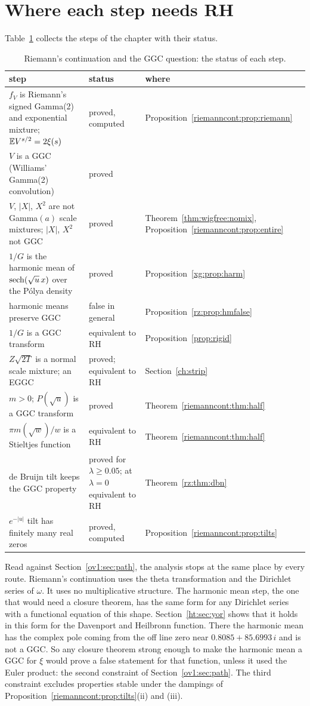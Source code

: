 \section{Where each step needs RH}\label{riemanncont:sec:path}

Table~\ref{riemanncont:tab:steps} collects the steps of the chapter with their status.

\begin{table}[htbp]
\centering\small
\begin{tabular}{p{}p{}p{}}
\toprule
step & status & where\\
\midrule
$f_V$ is Riemann's signed Gamma(2) and exponential mixture; $\mathbb{E} V^{s/2}=2\xi(s)$ & \raggedright proved, computed & Proposition~\ref{riemanncont:prop:riemann}\tabularnewline
$V$ is a GGC (Williams' Gamma(2) convolution) & proved & \cite{Williams90,BPY01}\tabularnewline
$V$, $|X|$, $X^2$ are not Gamma$(a)$ scale mixtures; $|X|$, $X^2$ not GGC & proved & \raggedright Theorem~\ref{thm:wigfree:nomix}, Proposition~\ref{riemanncont:prop:entire}\tabularnewline
$1/G$ is the harmonic mean of $\operatorname{sech}(\sqrt u\,x)$ over the P\'olya density & proved & Proposition~\ref{xg:prop:harm}\tabularnewline
harmonic means preserve GGC & false in general & Proposition~\ref{rz:prop:hmfalse}\tabularnewline
$1/G$ is a GGC transform & equivalent to RH & Proposition~\ref{prop:rigid}\tabularnewline
$Z\sqrt{2T}$ is a normal scale mixture; an EGGC & \raggedright proved; equivalent to RH & Section~\ref{ch:strip}\tabularnewline
$m>0$; $P(\sqrt u)$ is a GGC transform & proved & Theorem~\ref{riemanncont:thm:half}\tabularnewline
$\pi m(\sqrt w)/w$ is a Stieltjes function & equivalent to RH & Theorem~\ref{riemanncont:thm:half}\tabularnewline
de Bruijn tilt keeps the GGC property & \raggedright proved for $\lambda\ge0.05$; at $\lambda=0$ equivalent to RH & Theorem~\ref{rz:thm:dbn}\tabularnewline
$e^{-|u|}$ tilt has finitely many real zeros & proved, computed & Proposition~\ref{riemanncont:prop:tilts}\tabularnewline
\bottomrule
\end{tabular}
\caption{Riemann's continuation and the GGC question: the status of each step.}
\label{riemanncont:tab:steps}
\end{table}

Read against Section~\ref{ov1:sec:path}, the analysis stops at the same place by every route. Riemann's continuation uses the theta transformation and the Dirichlet series of $\omega$. It uses no multiplicative structure. The harmonic mean step, the one that would need a closure theorem, has the same form for any Dirichlet series with a functional equation of this shape. Section~\ref{ht:sec:yor} shows that it holds in this form for the Davenport and Heilbronn function. There the harmonic mean has the complex pole coming from the off line zero near $0.8085+85.6993\,i$ and is not a GGC. So any closure theorem strong enough to make the harmonic mean a GGC for $\xi$ would prove a false statement for that function, unless it used the Euler product: the second constraint of Section~\ref{ov1:sec:path}. The third constraint excludes properties stable under the dampings of Proposition~\ref{riemanncont:prop:tilts}(ii) and (iii).

